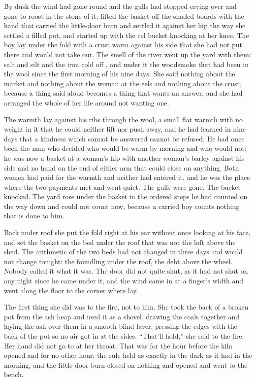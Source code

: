 By dusk the wind had gone round and the gulls had stopped crying over  and gone to roost in the stone of it.  lifted the basket off the shaded boards with the hand that carried the little-door burn and settled it against her hip the way she settled a filled pot, and started up  with the eel bucket knocking at her knee. The boy lay under the fold with a crust warm against his side that she had not put there and would not take out. The smell of the river went up the yard with them: salt and silt and the iron cold off , and under it the woodsmoke that had been in the wool since the first morning of his nine days. She said nothing about the market and nothing about the woman at the eels and nothing about the crust, because a thing said aloud becomes a thing that wants an answer, and she had arranged the whole of her life around not wanting one.

The warmth lay against his ribs through the wool, a small flat warmth with no weight in it that he could neither lift nor push away, and he had learned in nine days that a kindness which cannot be answered cannot be refused. He had once been the man who decided who would be warm by morning and who would not; he was now a basket at a woman's hip with another woman's barley against his side and no hand on the end of either arm that could close on anything. Both women had paid for the warmth and neither had entered it, and he was the place where the two payments met and went quiet. The gulls were gone. The bucket knocked. The yard rose under the basket in the ordered steps he had counted on the way down and could not count now, because a carried boy counts nothing that is done to him.

Back under  roof she put the fold right at his ear without once looking at his face, and set the basket on the bed under the roof that was not the loft above the shed. The arithmetic of the two beds had not changed in three days and would not change tonight: the foundling under the roof, the debt above the wheel. Nobody called it what it was. The door did not quite shut, as it had not shut on any night since he came under it, and the wind came in at a finger's width and went along the floor to the corner where  lay.

The first thing she did was to the fire, not to him. She took the back of a broken pot from the ash heap and used it as a shovel, drawing the coals together and laying the ash over them in a smooth blind layer, pressing the edges with the back of the pot so no air got in at the sides. “That'll hold,” she said to the fire. Her hand did not go to  at her throat. That was for the hour before the kiln opened and for no other hour; the rule held as exactly in the dark as it had in the morning, and the little-door burn closed on nothing and opened and went to the bench.

